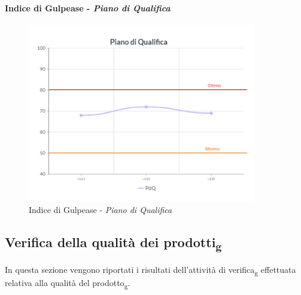 \paragraph{Indice di Gulpease - \textit{Piano di Qualifica}}
\begin{center}
\begin{figure}[H]
  \centering
  \renewcommand{\thefigure}{17}
  \includegraphics[width=10cm]{./res/images/PdQGraph.png}
  \caption{Indice di Gulpease - \textit{Piano di Qualifica}}
  \label{fig:Indice di Gulpease - Piano di Qualifica}
\end{figure}
\end{center}
\pagebreak
\subsection{Verifica della qualità dei prodotti\textsubscript{g}}
In questa sezione vengono riportati i risultati dell'attività di verifica\textsubscript{g} effettuata relativa alla qualità del prodotto\textsubscript{g}.\\

